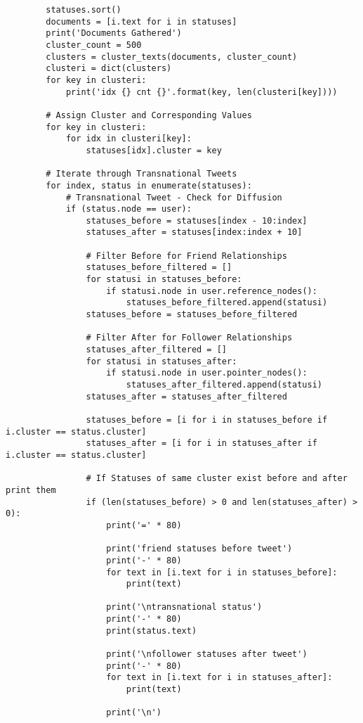\begin{lstlisting}
        statuses.sort()
        documents = [i.text for i in statuses]
        print('Documents Gathered')
        cluster_count = 500
        clusters = cluster_texts(documents, cluster_count)
        clusteri = dict(clusters)
        for key in clusteri:
            print('idx {} cnt {}'.format(key, len(clusteri[key])))
        
        # Assign Cluster and Corresponding Values
        for key in clusteri:
            for idx in clusteri[key]:
                statuses[idx].cluster = key
        
        # Iterate through Transnational Tweets
        for index, status in enumerate(statuses):
            # Transnational Tweet - Check for Diffusion
            if (status.node == user):
                statuses_before = statuses[index - 10:index]
                statuses_after = statuses[index:index + 10]
                
                # Filter Before for Friend Relationships
                statuses_before_filtered = []
                for statusi in statuses_before:
                    if statusi.node in user.reference_nodes():
                        statuses_before_filtered.append(statusi)
                statuses_before = statuses_before_filtered
                
                # Filter After for Follower Relationships
                statuses_after_filtered = []
                for statusi in statuses_after:
                    if statusi.node in user.pointer_nodes():
                        statuses_after_filtered.append(statusi)
                statuses_after = statuses_after_filtered
                
                statuses_before = [i for i in statuses_before if i.cluster == status.cluster]
                statuses_after = [i for i in statuses_after if i.cluster == status.cluster]
                
                # If Statuses of same cluster exist before and after print them
                if (len(statuses_before) > 0 and len(statuses_after) > 0):
                    print('=' * 80)
                    
                    print('friend statuses before tweet')
                    print('-' * 80)
                    for text in [i.text for i in statuses_before]:
                        print(text)
                    
                    print('\ntransnational status')
                    print('-' * 80)
                    print(status.text)
                    
                    print('\nfollower statuses after tweet')
                    print('-' * 80)
                    for text in [i.text for i in statuses_after]:
                        print(text)
                    
                    print('\n')
\end{lstlisting}
